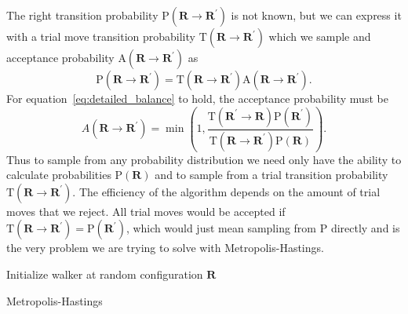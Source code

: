 The right transition probability $\mathrm P(\mathbf{R} \rightarrow \mathbf{R}^\prime)$ is not known, but we can express it with a trial move transition probability $\mathrm{T}(\mathbf{R} \rightarrow \mathbf{R}^\prime)$ which we sample and acceptance probability $\mathrm{A}(\mathbf{R} \rightarrow \mathbf{R}^\prime)$ as
\begin{equation}
	\mathrm P(\mathbf{R} \rightarrow \mathbf{R}^\prime) = \mathrm T(\mathbf{R} \rightarrow \mathbf{R}^\prime) \mathrm A(\mathbf{R} \rightarrow \mathbf{R}^\prime).
\end{equation}
For equation~\eqref{eq:detailed_balance} to hold, the acceptance probability must be 
\begin{equation}
	A\left(\mathbf{R} \rightarrow \mathbf{R}^{\prime}\right)=\min \left(1, \frac{\mathrm{T}\left(\mathbf{R}^{\prime} \rightarrow \mathbf{R}\right) \mathrm{P}\left(\mathbf{R}^{\prime}\right)}{\mathrm{T}\left(\mathbf{R} \rightarrow \mathbf{R}^{\prime}\right) \mathrm{P}(\mathbf{R})}\right).
\end{equation}
Thus to sample from any probability distribution we need only have the ability to calculate probabilities $\mathrm P(\mathbf{R})$ and to sample from a trial transition probability $\mathrm T(\mathbf{R} \rightarrow \mathbf{R}^{\prime})$. The efficiency of the algorithm depends on the amount of trial moves that we reject. All trial moves would be accepted if $\mathrm{T}(\mathbf{R} \rightarrow \mathbf{R}^{\prime})= \mathrm{P}(\mathbf{R}^\prime)$, which would just mean sampling from $\mathrm P$ directly and is the very problem we are trying to solve with Metropolis-Hastings. 	
\begin{algorithm}
	\label{alg:MCMC}
	\SetAlgoLined
	Initialize walker at random configuration $\mathbf{R}$\;
	\caption{Metropolis-Hastings}
\end{algorithm}

